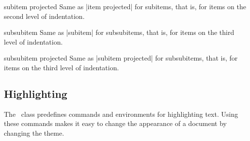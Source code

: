 \begin{element}{subitem projected}\no\yes\yes
  Same as |item projected| for subitems, that is, for items on the second level of indentation.
\end{element}

\begin{element}{subsubitem}\no\yes\yes
  Same as |subitem| for subsubitems, that is, for items on the third level of indentation.
\end{element}

\begin{element}{subsubitem projected}\no\yes\yes
  Same as |subitem projected| for subsubitems, that is, for items on the third level of indentation.
\end{element}


\subsection{Highlighting}

The \beamer\ class predefines commands and environments for highlighting text. Using these commands makes it easy to change the appearance of a document by changing the theme.

